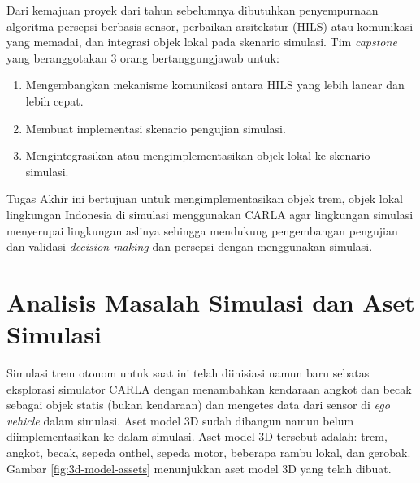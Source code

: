 Dari kemajuan proyek dari tahun sebelumnya dibutuhkan  penyempurnaan algoritma
persepsi berbasis sensor, perbaikan arsitekstur (HILS) atau komunikasi yang
memadai, dan integrasi objek lokal pada skenario simulasi. Tim \textit{capstone}
yang beranggotakan 3 orang bertanggungjawab untuk:

\begin{enumerate}

	\item Mengembangkan mekanisme komunikasi antara HILS yang lebih lancar dan
	lebih cepat.
	\item Membuat implementasi skenario pengujian simulasi.
	\item Mengintegrasikan atau mengimplementasikan objek lokal ke skenario
	simulasi.

\end{enumerate}

Tugas Akhir ini bertujuan untuk mengimplementasikan objek trem, objek lokal
lingkungan Indonesia di simulasi menggunakan CARLA agar lingkungan simulasi
menyerupai lingkungan aslinya sehingga mendukung pengembangan pengujian dan
validasi \textit{decision making} dan persepsi dengan menggunakan simulasi.

\section{Analisis Masalah Simulasi dan Aset Simulasi}

Simulasi trem otonom untuk saat ini telah diinisiasi namun baru sebatas
eksplorasi simulator CARLA dengan menambahkan kendaraan angkot dan becak sebagai
objek statis (bukan kendaraan) dan mengetes data dari sensor di \textit{ego
vehicle} dalam simulasi. Aset model 3D sudah dibangun namun belum
diimplementasikan ke dalam simulasi. Aset model 3D tersebut adalah: trem,
angkot, becak, sepeda onthel, sepeda motor, beberapa rambu lokal, dan gerobak.
Gambar \ref{fig:3d-model-assets} menunjukkan aset model 3D yang telah dibuat.

